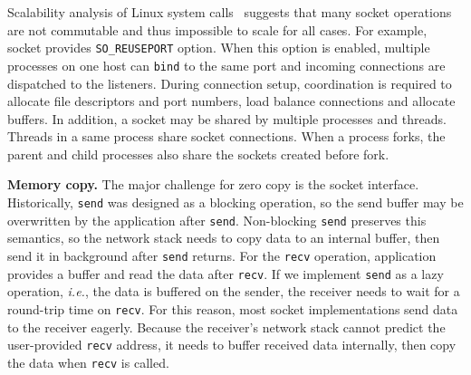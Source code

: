 Scalability analysis of Linux system calls~\cite{boyd2010analysis,clements2015scalable} suggests that many socket operations are not commutable and thus impossible to scale for all cases. For example, socket provides \texttt{SO\_REUSEPORT} option. When this option is enabled, multiple processes on one host can \texttt{bind} to the same port and incoming connections are dispatched to the listeners. During connection setup, coordination is required to allocate file descriptors and port numbers, load balance connections and allocate buffers. In addition, a socket may be shared by multiple processes and threads. Threads in a same process share socket connections. When a process forks, the parent and child processes also share the sockets created before fork.

\textbf{Memory copy.}
The major challenge for zero copy is the socket interface.
Historically, \texttt{send} was designed as a blocking operation, so the send buffer may be overwritten by the application after \texttt{send}.
Non-blocking \texttt{send} preserves this semantics, so the network stack needs to copy data to an internal buffer, then send it in background after \texttt{send} returns.
For the \texttt{recv} operation, application provides a buffer and read the data after \texttt{recv}.
If we implement \texttt{send} as a lazy operation, \textit{i.e.}, the data is buffered on the sender, the receiver needs to wait for a round-trip time on \texttt{recv}.
For this reason, most socket implementations send data to the receiver eagerly.
Because the receiver's network stack cannot predict the user-provided \texttt{recv} address, it needs to buffer received data internally, then copy the data when \texttt{recv} is called.

